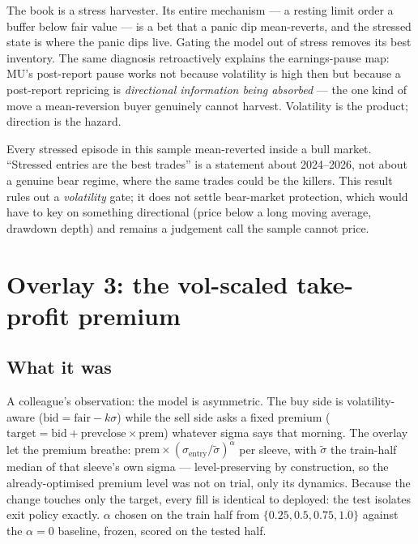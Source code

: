 \documentclass[11pt,a4paper]{article}
\begin{document}
The book is a stress harvester. Its entire mechanism --- a resting limit order a
buffer below fair value --- is a bet that a panic dip mean-reverts, and the
stressed state is where the panic dips live. Gating the model out of stress
removes its best inventory. The same diagnosis retroactively explains the
earnings-pause map: MU's post-report pause works not because volatility is high
then but because a post-report repricing is \emph{directional information being
absorbed} --- the one kind of move a mean-reversion buyer genuinely cannot
harvest. Volatility is the product; direction is the hazard.

\begin{tcolorbox}[colback=bcgold!8, colframe=bcgold, boxrule=0.8pt,
  title={\bfseries Caveat --- carried forward}, coltitle=bcnavy]
Every stressed episode in this sample mean-reverted inside a bull market.
``Stressed entries are the best trades'' is a statement about 2024--2026, not
about a genuine bear regime, where the same trades could be the killers. This
result rules out a \emph{volatility} gate; it does not settle bear-market
protection, which would have to key on something directional (price below a long
moving average, drawdown depth) and remains a judgement call the sample cannot
price.
\end{tcolorbox}

\section{Overlay 3: the vol-scaled take-profit premium}

\subsection{What it was}

A colleague's observation: the model is asymmetric. The buy side is
volatility-aware ($\text{bid} = \text{fair} - k\sigma$) while the sell side asks a
fixed premium ($\text{target} = \text{bid} + \text{prevclose} \times
\text{prem}$) whatever sigma says that morning. The overlay let the premium
breathe: $\text{prem} \times (\sigma_{\text{entry}}/\tilde\sigma)^{\alpha}$ per
sleeve, with $\tilde\sigma$ the train-half median of that sleeve's own sigma ---
level-preserving by construction, so the already-optimised premium level was not
on trial, only its dynamics. Because the change touches only the target, every
fill is identical to deployed: the test isolates exit policy exactly. $\alpha$
chosen on the train half from $\{0.25, 0.5, 0.75, 1.0\}$ against the $\alpha=0$
baseline, frozen, scored on the tested half.
\end{document}
